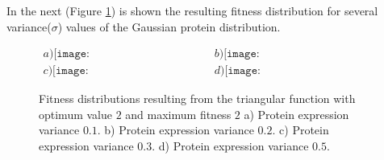 In the next (Figure \ref{Fig7.3}) is shown the resulting fitness distribution for several  variance($\sigma$) values of the Gaussian protein distribution. 

\begin{figure}[H]
\begin{center}$
\begin{array}{cc}
a)\texttt{[image: triangularfitness01.pdf]} &
b)\texttt{[image: triangularfitness02.pdf]}\\
c)\texttt{[image: triangularfitness03.pdf]} &
d)\texttt{[image: triangularfitness05.pdf]} 
\end{array}$
\end{center}
\caption{Fitness distributions resulting from the triangular function with optimum value $2$ and maximum fitness $2$ a) Protein expression variance $0.1$. b) Protein expression variance $0.2$. c) Protein expression variance $0.3$. d) Protein expression variance $0.5$.}
\label{Fig7.3}
\end{figure}

